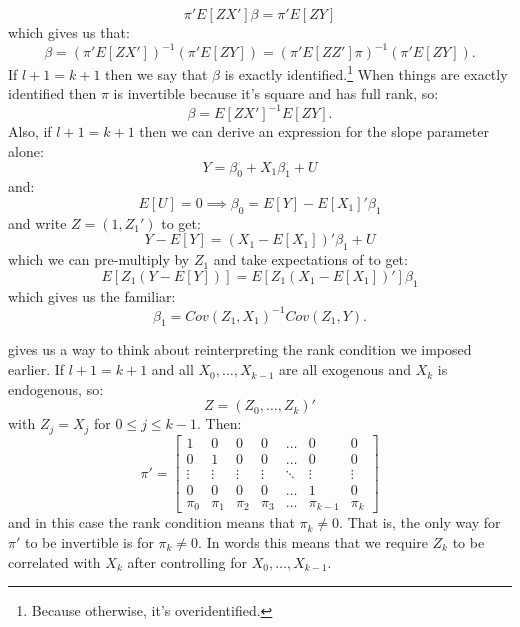 \documentclass{tufte-book}
\theoremstyle{mytheoremstyle}
\theoremstyle{mylemstyle}
\theoremstyle{mydefstyle}
\begin{document}
	\[\pi'E[ZX']\beta = \pi' E[ZY]\]
which gives us that:
	\[\beta = (\pi'E[ZX'])^{-1}(\pi'E[ZY]) = (\pi'E[ZZ']\pi)^{-1}(\pi'E[ZY]) \text{.}\]
If \(l + 1 = k + 1\) then we say that \(\beta\) is exactly identified.\footnote{Because otherwise, it's overidentified.} When things are exactly identified then \(\pi\) is invertible because it's square and has full rank, so:
	\[\beta = E[ZX']^{-1}E[ZY] \text{.}\]
Also, if \(l +1 = k + 1\) then we can derive an expression for the slope parameter alone:
	\[Y = \beta_0 + X_1\beta_1 + U\]
and:
	\[E[U] = 0 \implies \beta_0 = E[Y] - E[X_1]'\beta_1\]
and write \(Z = (1, Z_1')\) to get:
	\[Y - E[Y] = (X_1 - E[X_1])' \beta_1 + U\]
which we can pre-multiply by \(Z_1\) and take expectations of to get:
	\[E[Z_1(Y - E[Y])] = E[Z_1(X_1 - E[X_1])']\beta_1\]
which gives us the familiar:
	\[\beta_1 = Cov(Z_1, X_1)^{-1}Cov(Z_1, Y) \text{.}\]

 gives us a way to think about reinterpreting the rank condition we imposed earlier. If \(l + 1 = k+1\) and all \(X_0, \dots, X_{k-1}\) are all exogenous and \(X_k\) is endogenous, so:
	\[Z = (Z_0, \dots, Z_k)'\]
with \(Z_j = X_j\) for \(0 \le j \le k-1\). Then:
	\[\pi' = \left[\begin{array}{ccccccc}
		1 & 0 & 0 & 0 & \dots & 0 &0 \\
		0 & 1 & 0 & 0 & \dots & 0 & 0 \\
		\vdots & \vdots &  \vdots &\vdots &\ddots &\vdots & \vdots \\
		0 & 0 & 0 & 0 & \dots & 1 & 0 \\
		\pi_0 & \pi_1 & \pi_2 & \pi_3 & \dots & \pi_{k-1} & \pi_k  \end{array}\right] \]
and in this case the rank condition means that \(\pi_k \ne 0\). That is, the only way for \(\pi'\) to be invertible is for \(\pi_k \ne 0\). In words this means that we require \(Z_k\) to be correlated with \(X_k\) after controlling for \(X_0, \dots, X_{k-1}\). 
\end{document}
